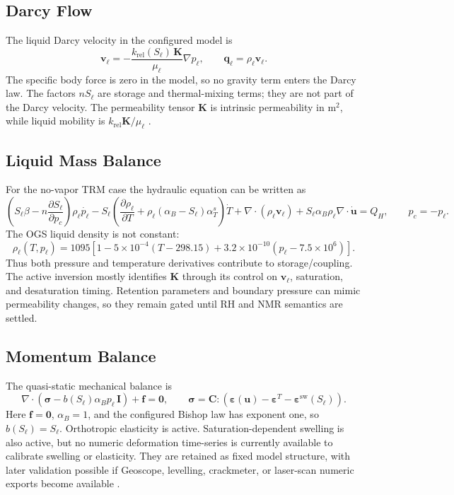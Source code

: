 \documentclass[10pt,a4paper]{article}
\newcommand{\uu}{\bm{u}}
\newcommand{\sig}{\bm{\sigma}}
\newcommand{\I}{\bm{I}}
\newcommand{\grad}{\nabla}
\newcommand{\divv}{\nabla\!\cdot}
\newcommand{\TT}{T}
\newcommand{\pp}{p_\ell}
\newcommand{\pcap}{p_c}
\newcommand{\rhoW}{\rho_\ell}
\newcommand{\muW}{\mu_\ell}
\newcommand{\npor}{n}
\newcommand{\Sat}{S_\ell}
\newcommand{\alphaB}{\alpha_B}
\newcommand{\vW}{\bm v_\ell}
\newcommand{\K}{\bm K}
\newcommand{\krel}{k_{\mathrm{rel}}}
\begin{document}
\subsection{Darcy Flow}

The liquid Darcy velocity in the configured model is
\[
  \vW = -\frac{\krel(\Sat)\,\K}{\muW}\grad \pp ,
  \qquad
  \bm q_\ell=\rhoW\vW .
\]
The specific body force is zero in the model, so no gravity term enters the Darcy
law.  The factors \(\npor\Sat\) are storage and thermal-mixing terms; they are not
part of the Darcy velocity.  The permeability tensor \(\K\) is intrinsic
permeability in \(\mathrm{m^2}\), while liquid mobility is
\(\krel\K/\muW\) \citep{OpenGeoSysTRMDocs}.

\subsection{Liquid Mass Balance}

For the no-vapor TRM case the hydraulic equation can be written as
\[
\left(\Sat\beta-\npor\frac{\partial\Sat}{\partial \pcap}\right)\rhoW\dot{\pp}
-
\Sat\left(\frac{\partial\rhoW}{\partial\TT}
      +\rhoW(\alphaB-\Sat)\alpha_T^s\right)\dot{\TT}
+ \divv(\rhoW\vW)
+ \Sat\alphaB\rhoW\divv\dot{\uu}
= Q_H,
\qquad
\pcap=-\pp .
\]
The OGS liquid density is not constant:
\[
\rhoW(\TT,\pp)
=1095\left[1-5\times10^{-4}(\TT-298.15)
+3.2\times10^{-10}(\pp-7.5\times10^6)\right].
\]
Thus both pressure and temperature derivatives contribute to storage/coupling.  The
active inversion mostly identifies \(\K\) through its control on \(\vW\), saturation,
and desaturation timing.  Retention parameters and boundary pressure can mimic
permeability changes, so they remain gated until RH and NMR semantics are settled.

\subsection{Momentum Balance}

The quasi-static mechanical balance is
\[
\divv\left(\sig - b(\Sat)\alphaB \pp\,\I\right)+\bm f = \bm 0,
\qquad
\sig = \bm C:\left(\bm\varepsilon(\uu)-\bm\varepsilon^T
-\bm\varepsilon^{\mathrm{sw}}(\Sat)\right).
\]
Here \(\bm f=\bm{0}\), \(\alphaB=1\), and the configured Bishop law has exponent
one, so \(b(\Sat)=\Sat\).  Orthotropic elasticity is active.  Saturation-dependent
swelling is also active, but no numeric deformation time-series is currently
available to calibrate swelling or elasticity.  They are retained as fixed model
structure, with later validation possible if Geoscope, levelling, crackmeter, or
laser-scan numeric exports become available \citep{Amann2015}.
\end{document}
